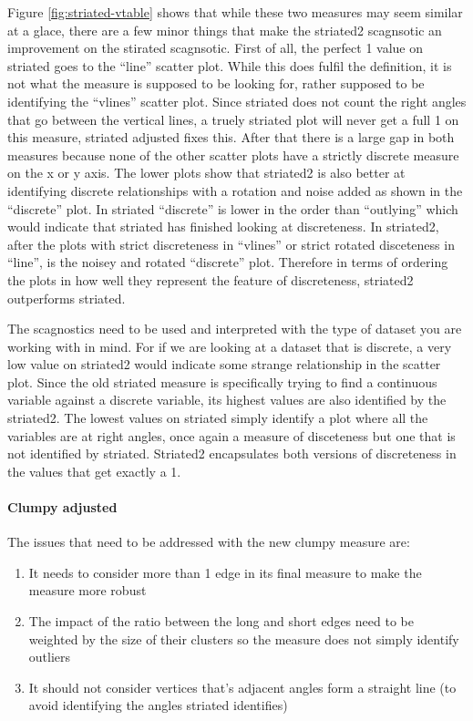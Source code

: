 Figure \ref{fig:striated-vtable} shows that while these two measures may
seem similar at a glace, there are a few minor things that make the
striated2 scagnsotic an improvement on the stirated scagnsotic. First of
all, the perfect 1 value on striated goes to the ``line'' scatter plot.
While this does fulfil the definition, it is not what the measure is
supposed to be looking for, rather supposed to be identifying the
``vlines'' scatter plot. Since striated does not count the right angles
that go between the vertical lines, a truely striated plot will never
get a full 1 on this measure, striated adjusted fixes this. After that
there is a large gap in both measures because none of the other scatter
plots have a strictly discrete measure on the x or y axis. The lower
plots show that striated2 is also better at identifying discrete
relationships with a rotation and noise added as shown in the
``discrete'' plot. In striated ``discrete'' is lower in the order than
``outlying'' which would indicate that striated has finished looking at
discreteness. In striated2, after the plots with strict discreteness in
``vlines'' or strict rotated disceteness in ``line'', is the noisey and
rotated ``discrete'' plot. Therefore in terms of ordering the plots in
how well they represent the feature of discreteness, striated2
outperforms striated.

The scagnostics need to be used and interpreted with the type of dataset
you are working with in mind. For if we are looking at a dataset that is
discrete, a very low value on striated2 would indicate some strange
relationship in the scatter plot. Since the old striated measure is
specifically trying to find a continuous variable against a discrete
variable, its highest values are also identified by the striated2. The
lowest values on striated simply identify a plot where all the variables
are at right angles, once again a measure of disceteness but one that is
not identified by striated. Striated2 encapsulates both versions of
discreteness in the values that get exactly a 1.

\hypertarget{clumpy-adjusted}{%
\paragraph{Clumpy adjusted}\label{clumpy-adjusted}}

The issues that need to be addressed with the new clumpy measure are:

\begin{enumerate}
\def\labelenumi{\arabic{enumi}.}
\tightlist
\item
  It needs to consider more than 1 edge in its final measure to make the
  measure more robust
\item
  The impact of the ratio between the long and short edges need to be
  weighted by the size of their clusters so the measure does not simply
  identify outliers
\item
  It should not consider vertices that's adjacent angles form a straight
  line (to avoid identifying the angles striated identifies)
\end{enumerate}


